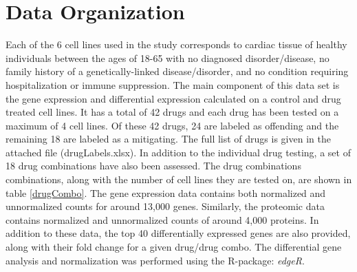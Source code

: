\documentclass[]{article}
\begin{document}
\section{Data Organization}

Each of the 6 cell lines used in the study corresponds to cardiac tissue of healthy individuals between the ages of 18-65 with no diagnosed disorder/disease, no family  history of a genetically-linked disease/disorder, and no condition requiring hospitalization or immune suppression.
The main component of this data set is the gene expression and differential expression calculated on a control and drug treated cell lines. It has a total of 42 drugs and each drug has been tested on a maximum of 4 cell lines. 
Of these 42 drugs, 24 are labeled as offending and the remaining 18 are labeled as a mitigating. The full list of drugs is given in the attached file (drugLabels.xlsx).
In addition to the individual drug testing, a set of 18 drug combinations have also been assessed. The drug combinations combinations, along with the number of cell lines they are tested on, are shown in table \ref{drugCombo}. 
The gene expression data contains both normalized and unnormalized counts for around 13,000 genes. Similarly, the proteomic data contains normalized and unnormalized counts of around 4,000 proteins.
In addition to these data, the top 40 differentially expressed genes are also provided, along with their fold change for a given drug/drug combo. The differential gene analysis and normalization was performed using the R-package: \emph{edgeR}.
\end{document}
